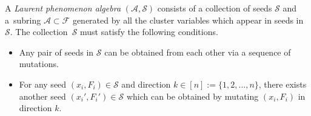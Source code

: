 \documentclass[10pt,a4paper]{amsart}
\numberwithin{equation}{section}
\newcommand{\new}[1]{{#1}}
\begin{document}
\begin{Definition}
A \emph{Laurent phenomenon algebra} $(\mathcal{A}, \mathcal{S})$ consists of a collection of seeds $\mathcal{S}$ and a~subring $\mathcal{A} \subset \mathcal{F}$ generated by all the cluster variables which appear in seeds in~$\mathcal{S}$. The collection~$\mathcal{S}$ must satisfy the following conditions.
\begin{itemize}\itemsep=0pt
 \item Any pair of seeds in $\mathcal{S}$ can be obtained from each other via a sequence of mutations.
 \item For any seed $(x_i,F_i) \in \mathcal{S}$ and direction $k \in [n]\new{:=\{1,2,\dots,n\}}$, there exists another seed $(x_i',F_i') \in \mathcal{S}$ which can be obtained by mutating $(x_i,F_i)$ in direction $k$.
\end{itemize}
\end{Definition}
\end{document}
